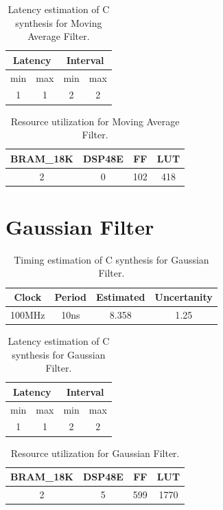\documentclass[en,printmode]{mgr}
\begin{document}
	\begin{table}[H]
		\centering
		\caption{}
		\begin{tabular}{|c|c|c|c|}
		\hline
		\multicolumn{2}{|c|}{Latency} & \multicolumn{2}{c|}{Interval} \\ \hline
			min           & max           & min           & max           \\ \hline
			1             & 1             & 2             & 2             \\ \hline
		\end{tabular}
		\caption{Latency estimation of C synthesis for Moving Average Filter.}
	\end{table}
	
	\begin{table}[H]
		\centering
		\caption{}
		\begin{tabular}{|c|c|c|c|}
		\hline
		BRAM\_18K & DSP48E & FF  & LUT \\ \hline
		2         & 0      & 102 & 418 \\ \hline
		\end{tabular}
		\caption{Resource utilization for Moving Average Filter.}
	\end{table}
	
	\section{Gaussian Filter}
	\begin{table}[H]
		\centering
		\caption{}
		\begin{tabular}{|c|c|c|c|}
		\hline
		Clock  & Period & Estimated & Uncertanity \\ \hline
		100MHz & 10ns   & 8.358     & 1.25        \\ \hline
		\end{tabular}
		\caption{Timing estimation of C synthesis for Gaussian Filter.}
	\end{table}
	
	\begin{table}[H]
		\centering
		\caption{}
		\begin{tabular}{|c|c|c|c|}
		\hline
		\multicolumn{2}{|c|}{Latency} & \multicolumn{2}{c|}{Interval} \\ \hline
			min           & max           & min           & max           \\ \hline
			1             & 1             & 2             & 2             \\ \hline
		\end{tabular}
		\caption{Latency estimation of C synthesis for Gaussian Filter.}
	\end{table}
	\begin{table}[H]
		\centering
		\caption{}
		\begin{tabular}{|c|c|c|c|}
		\hline
		BRAM\_18K & DSP48E & FF  & LUT \\ \hline
		2         & 5      & 599 & 1770\\ \hline
		\end{tabular}
		\caption{Resource utilization for Gaussian Filter.}
	\end{table}
\end{document}
